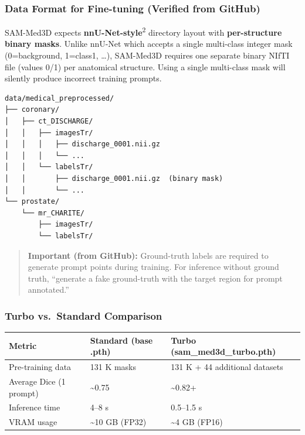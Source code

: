 \documentclass[
  11pt,
]{article}
\begin{document}
\subsubsection{Data Format for Fine-tuning (Verified from
GitHub)}\label{data-format-for-fine-tuning-verified-from-github}

SAM-Med3D expects \textbf{nnU-Net-style}\textsuperscript{2} directory
layout with \textbf{per-structure binary masks}. Unlike nnU-Net which
accepts a single multi-class integer mask (0=background, 1=class1,
\ldots), SAM-Med3D requires one separate binary NIfTI file (values 0/1)
per anatomical structure. Using a single multi-class mask will silently
produce incorrect training prompts.

\begin{verbatim}
data/medical_preprocessed/
├── coronary/
│   ├── ct_DISCHARGE/
│   │   ├── imagesTr/
│   │   │   ├── discharge_0001.nii.gz
│   │   │   └── ...
│   │   └── labelsTr/
│   │       ├── discharge_0001.nii.gz  (binary mask)
│   │       └── ...
└── prostate/
    └── mr_CHARITE/
        ├── imagesTr/
        └── labelsTr/
\end{verbatim}

\begin{quote}
\textbf{Important (from GitHub):} Ground-truth labels are required to
generate prompt points during training. For inference without ground
truth, ``generate a fake ground-truth with the target region for prompt
annotated.''
\end{quote}

\subsubsection{Turbo vs.~Standard
Comparison}\label{turbo-vs.-standard-comparison}

\begin{longtable}[]{@{}lll@{}}
\toprule\noalign{}
Metric & Standard (base .pth) & Turbo (sam\_med3d\_turbo.pth) \\
\midrule\noalign{}
\endhead
\bottomrule\noalign{}
\endlastfoot
Pre-training data & 131 K masks & 131 K + 44 additional datasets \\
Average Dice (1 prompt) & \textasciitilde0.75 & \textasciitilde0.82+ \\
Inference time & 4--8 s & 0.5--1.5 s \\
VRAM usage & \textasciitilde10 GB (FP32) & \textasciitilde4 GB (FP16) \\
\end{longtable}
\end{document}

